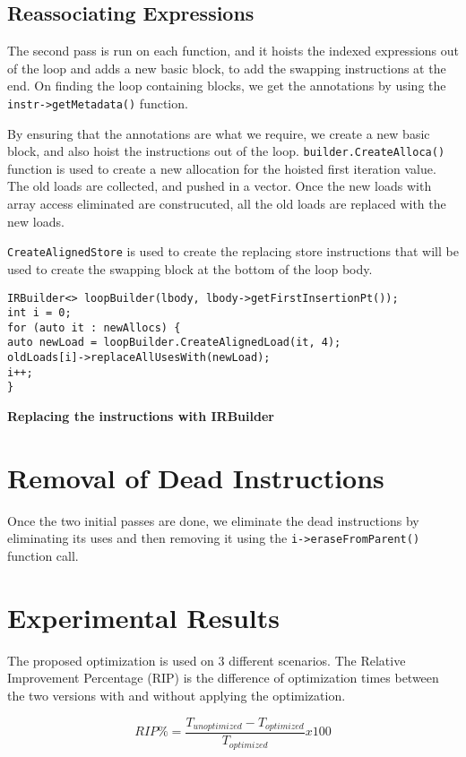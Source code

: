 \subsection{Reassociating Expressions}
The second pass is run on each function, and it hoists the indexed expressions out of the loop and adds a new basic block, to add the swapping instructions at the end. On finding the loop containing blocks, we get the annotations by using the \texttt{instr->getMetadata()} function. 

By ensuring that the annotations are what we require, we create a new basic block, and also hoist the instructions out of the loop. \texttt{builder.CreateAlloca()} function is used to create a new allocation for the hoisted first iteration value. The old loads are collected, and pushed in a vector. Once the new loads with array access eliminated are construcuted, all the old loads are replaced with the new loads. 

\texttt{CreateAlignedStore} is used to create the replacing store instructions that will be used to create the swapping block at the bottom of the loop body. 

\begin{lstlisting}
IRBuilder<> loopBuilder(lbody, lbody->getFirstInsertionPt());
int i = 0;
for (auto it : newAllocs) {
auto newLoad = loopBuilder.CreateAlignedLoad(it, 4);
oldLoads[i]->replaceAllUsesWith(newLoad);
i++;
}

\end{lstlisting}
\hspace{55pt} \textbf{Replacing the instructions with IRBuilder}

\section{Removal of Dead Instructions}
Once the two initial passes are done, we eliminate the dead instructions by eliminating its uses and then removing it using the \texttt{i->eraseFromParent()} function call.


\section{Experimental Results}
The proposed optimization is used on 3 different scenarios. The Relative Improvement Percentage (RIP) is the difference of optimization times between the two versions with and without applying the optimization.

\begin{equation*}
RIP \% = \frac{T_{unoptimized}-T_{optimized}}{T_{optimized}} x 100%
\end{equation*}

